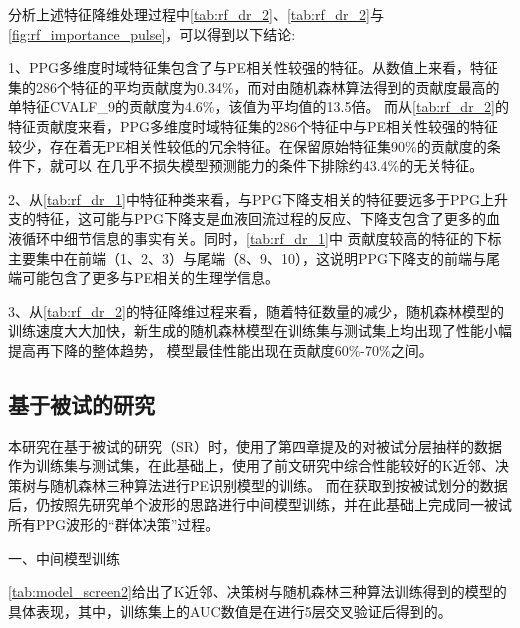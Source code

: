 \vspace{-0.8cm}

分析上述特征降维处理过程中\autoref{tab:rf_dr_2}、\autoref{tab:rf_dr_2}与\autoref{fig:rf_importance_pulse}，可以得到以下结论:

1、PPG多维度时域特征集包含了与PE相关性较强的特征。从数值上来看，特征集的286个特征的平均贡献度为0.34\%，而对由随机森林算法得到的贡献度最高的单特征CVALF\_9的贡献度为4.6\%，该值为平均值的13.5倍。
而从\autoref{tab:rf_dr_2}的特征贡献度来看，PPG多维度时域特征集的286个特征中与PE相关性较强的特征较少，存在着无PE相关性较低的冗余特征。在保留原始特征集90\%的贡献度的条件下，就可以
在几乎不损失模型预测能力的条件下排除约43.4\%的无关特征。

2、从\autoref{tab:rf_dr_1}中特征种类来看，与PPG下降支相关的特征要远多于PPG上升支的特征，这可能与PPG下降支是血液回流过程的反应、下降支包含了更多的血液循环中细节信息的事实有关。同时，\autoref{tab:rf_dr_1}中
贡献度较高的特征的下标主要集中在前端（1、2、3）与尾端（8、9、10），这说明PPG下降支的前端与尾端可能包含了更多与PE相关的生理学信息。

3、从\autoref{tab:rf_dr_2}的特征降维过程来看，随着特征数量的减少，随机森林模型的训练速度大大加快，新生成的随机森林模型在训练集与测试集上均出现了性能小幅提高再下降的整体趋势，
模型最佳性能出现在贡献度60\%-70\%之间。

\subsection{基于被试的研究}
本研究在基于被试的研究（SR）时，使用了第四章提及的对被试分层抽样的数据作为训练集与测试集，在此基础上，使用了前文研究中综合性能较好的K近邻、决策树与随机森林三种算法进行PE识别模型的训练。
而在获取到按被试划分的数据后，仍按照先研究单个波形的思路进行中间模型训练，并在此基础上完成同一被试所有PPG波形的“群体决策”过程。

一、中间模型训练

\autoref{tab:model_screen2}给出了K近邻、决策树与随机森林三种算法训练得到的模型的具体表现，其中，训练集上的AUC数值是在进行5层交叉验证后得到的。

